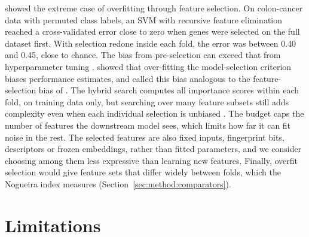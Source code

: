 \citet{Ambroise2002} showed the extreme case of overfitting through feature selection. On colon-cancer data with permuted class labels, an SVM with recursive feature elimination reached a cross-validated error close to zero when genes were selected on the full dataset first. With selection redone inside each fold, the error was between 0.40 and 0.45, close to chance. The bias from pre-selection can exceed that from hyperparameter tuning \citep{Vabalas2019}. \citet{Cawley2010} showed that over-fitting the model-selection criterion biases performance estimates, and called this bias analogous to the feature-selection bias of \citet{Ambroise2002}. The hybrid search computes all importance scores within each fold, on training data only, but searching over many feature subsets still adds complexity even when each individual selection is unbiased \citep{Tibshirani2015}. The budget caps the number of features the downstream model sees, which limits how far it can fit noise in the rest. The selected features are also fixed inputs, fingerprint bits, descriptors or frozen embeddings, rather than fitted parameters, and we consider choosing among them less expressive than learning new features. Finally, overfit selection would give feature sets that differ widely between folds, which the Nogueira index measures (Section~\ref{sec:method:comparators}).

\section{Limitations}\label{sec:method:limitations}

